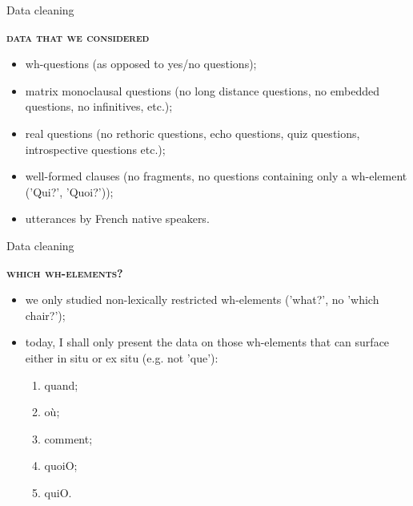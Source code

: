 \documentclass[lesson_slides]{subfiles}
\begin{document}
\begin{frame}[c]{Data cleaning}

    \textbf{\textsc{data that we considered}} \pause
    
    \begin{itemize}
        \item[\ding{227}] wh-questions \pause (as opposed to yes/no questions); \pause
        \item[\ding{227}] matrix monoclausal questions \pause (no long distance questions, no embedded questions, no infinitives, etc.); \pause
        \item[\ding{227}] real questions \pause (no rethoric questions, echo questions, quiz questions, introspective questions etc.); \pause
        \item[\ding{227}] well-formed clauses \pause (no fragments, no questions containing only a wh-element ('Qui?', 'Quoi?')); \pause
        \item[\ding{227}] utterances by French native speakers.
    \end{itemize}
    
\end{frame}
\begin{frame}[c]{Data cleaning}

    \textbf{\textsc{which wh-elements?}} \pause
    
    \begin{itemize}
        \item[\ding{227}] we only studied non-lexically restricted wh-elements ('what?', no 'which chair?'); \pause
        \item[\ding{227}] today, I shall only present the data on those wh-elements that can surface either in situ or ex situ (e.g. not 'que'): \pause
        \begin{enumerate}
            \item quand; \pause
            \item où; \pause
            \item comment; \pause
            \item quoiO; \pause
            \item quiO.
        \end{enumerate}
    \end{itemize}
    
\end{frame}
\end{document}
